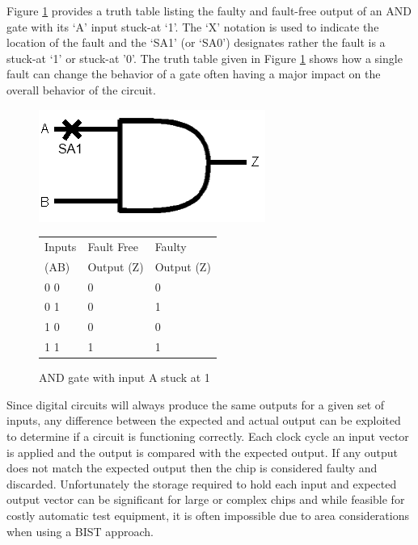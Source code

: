 \documentclass[12pt]{report}
\begin{document}
Figure \ref{fig:andtruth} provides a truth table listing the faulty and fault-free output of an AND gate with its `A' input stuck-at `1'.  The `X' notation is used to indicate the location of the fault and the `SA1' (or `SA0') designates rather the fault is a stuck-at `1' or stuck-at '0'\cite{stroud}.  The truth table given in Figure \ref{fig:andtruth} shows how a single fault can change the behavior of a gate often having a major impact on the overall behavior of the circuit.
\begin{figure}[b!]
	\begin{center}
	\begin{minipage}[l]{.45\textwidth}
		\includegraphics[scale=.7]{images/and-gate}
	\end{minipage}
	\begin{minipage}[r]{.45\textwidth}
		\begin{tabular}{|l|l|l|}
			\hline
			Inputs & Fault Free & Faulty \\
			(AB) & Output (Z) & Output (Z) \\ \hline
			0 0 & 0 & 0 \\ \hline
			0 1 & 0 & 1 \\ \hline
			1 0 & 0 & 0 \\ \hline
			1 1 & 1 & 1 \\ \hline
		\end{tabular}
	\end{minipage}
	\end{center}
	\caption{AND gate with input A stuck at 1}
	\label{fig:andtruth}
\end{figure}
Since digital circuits will always produce the same outputs for a given set of inputs, any difference between the expected and actual output can be exploited to determine if a circuit is functioning correctly\cite{stroud}.  Each clock cycle an input vector is applied and the output is compared with the expected output.  If any output does not match the expected output then the chip is considered faulty and discarded.  Unfortunately the storage required to hold each input and expected output vector can be significant for large or complex chips and while feasible for costly automatic test equipment, it is often impossible due to area considerations when using a BIST approach\cite{faultdiagnosis}.
\end{document}
